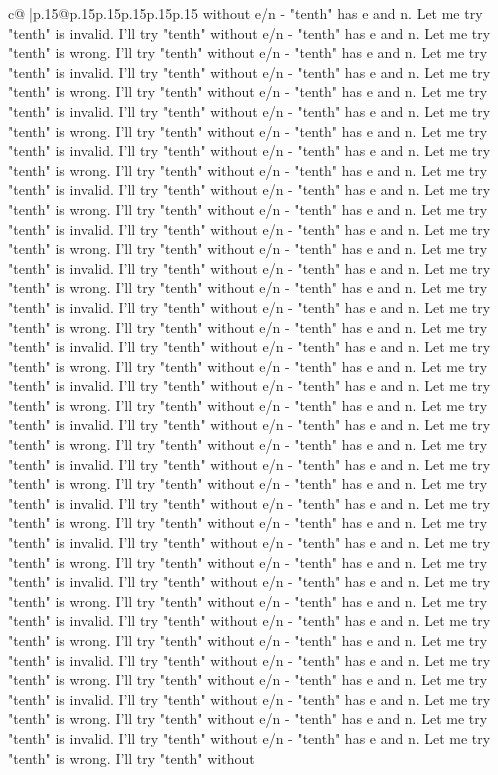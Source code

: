 \documentclass{article}
\begin{document}
{\begin{supertabular}{c@{$\;$}|p{.15\linewidth}@{}p{.15\linewidth}p{.15\linewidth}p{.15\linewidth}p{.15\linewidth}p{.15\linewidth}}
{{{without e/n {-} "tenth" has e and n. Let me try "tenth" is invalid. I'll try "tenth" without e/n {-} "tenth" has e and n. Let me try "tenth" is wrong. I'll try "tenth" without e/n {-} "tenth" has e and n. Let me try "tenth" is invalid. I'll try "tenth" without e/n {-} "tenth" has e and n. Let me try "tenth" is wrong. I'll try "tenth" without e/n {-} "tenth" has e and n. Let me try "tenth" is invalid. I'll try "tenth" without e/n {-} "tenth" has e and n. Let me try "tenth" is wrong. I'll try "tenth" without e/n {-} "tenth" has e and n. Let me try "tenth" is invalid. I'll try "tenth" without e/n {-} "tenth" has e and n. Let me try "tenth" is wrong. I'll try "tenth" without e/n {-} "tenth" has e and n. Let me try "tenth" is invalid. I'll try "tenth" without e/n {-} "tenth" has e and n. Let me try "tenth" is wrong. I'll try "tenth" without e/n {-} "tenth" has e and n. Let me try "tenth" is invalid. I'll try "tenth" without e/n {-} "tenth" has e and n. Let me try "tenth" is wrong. I'll try "tenth" without e/n {-} "tenth" has e and n. Let me try "tenth" is invalid. I'll try "tenth" without e/n {-} "tenth" has e and n. Let me try "tenth" is wrong. I'll try "tenth" without e/n {-} "tenth" has e and n. Let me try "tenth" is invalid. I'll try "tenth" without e/n {-} "tenth" has e and n. Let me try "tenth" is wrong. I'll try "tenth" without e/n {-} "tenth" has e and n. Let me try "tenth" is invalid. I'll try "tenth" without e/n {-} "tenth" has e and n. Let me try "tenth" is wrong. I'll try "tenth" without e/n {-} "tenth" has e and n. Let me try "tenth" is invalid. I'll try "tenth" without e/n {-} "tenth" has e and n. Let me try "tenth" is wrong. I'll try "tenth" without e/n {-} "tenth" has e and n. Let me try "tenth" is invalid. I'll try "tenth" without e/n {-} "tenth" has e and n. Let me try "tenth" is wrong. I'll try "tenth" without e/n {-} "tenth" has e and n. Let me try "tenth" is invalid. I'll try "tenth" without e/n {-} "tenth" has e and n. Let me try "tenth" is wrong. I'll try "tenth" without e/n {-} "tenth" has e and n. Let me try "tenth" is invalid. I'll try "tenth" without e/n {-} "tenth" has e and n. Let me try "tenth" is wrong. I'll try "tenth" without e/n {-} "tenth" has e and n. Let me try "tenth" is invalid. I'll try "tenth" without e/n {-} "tenth" has e and n. Let me try "tenth" is wrong. I'll try "tenth" without e/n {-} "tenth" has e and n. Let me try "tenth" is invalid. I'll try "tenth" without e/n {-} "tenth" has e and n. Let me try "tenth" is wrong. I'll try "tenth" without e/n {-} "tenth" has e and n. Let me try "tenth" is invalid. I'll try "tenth" without e/n {-} "tenth" has e and n. Let me try "tenth" is wrong. I'll try "tenth" without e/n {-} "tenth" has e and n. Let me try "tenth" is invalid. I'll try "tenth" without e/n {-} "tenth" has e and n. Let me try "tenth" is wrong. I'll try "tenth" without e/n {-} "tenth" has e and n. Let me try "tenth" is invalid. I'll try "tenth" without e/n {-} "tenth" has e and n. Let me try "tenth" is wrong. I'll try "tenth" without e/n {-} "tenth" has e and n. Let me try "tenth" is invalid. I'll try "tenth" without e/n {-} "tenth" has e and n. Let me try "tenth" is wrong. I'll try "tenth" without }}}
\end{supertabular}}
\end{document}
